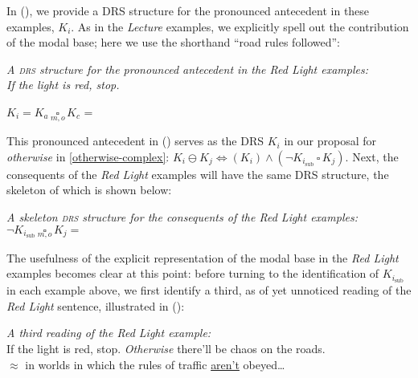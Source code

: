 In (\nextx), we provide a DRS structure for the pronounced antecedent in these examples, $K_i$. As in the \textit{Lecture} examples, we explicitly spell out the contribution of the modal base; here we use the shorthand ``road rules followed'':

\pex \label{redlight-Ki}\emph{A \textsc{drs} structure for the pronounced antecedent in the \emph{Red Light} examples:}\\
\emph{If the light is red, stop.}

\begin{center}
	$K_i=K_a\,\underset{m,o}{\square}\, K_c$ = 
\end{center}
\xe

This pronounced antecedent in (\lastx) serves as the DRS $K_i$ in our proposal for \textit{otherwise} in \ref{otherwise-complex}: $ K_i\ominus K_j\iff (K_i) \wedge (\neg K_{i_{\text{sub}}}\,\square\,K_j) $. Next, the consequents of the \textit{Red Light} examples will have the same DRS structure, the skeleton of which is shown below:

\pex \label{antec-skel}\emph{A skeleton \textsc{drs} structure for the consequents of the \emph{Red Light} examples:}\\
$\neg K_{i_{\text{sub}}}\,\underset{m,o}{\square}\,K_j = $ 
\xe


The usefulness of the explicit representation of the modal base in the \textit{Red Light} examples becomes clear at this point: before turning to the identification of $K_{i_{\text{sub}}}$ in each example above, we first identify a third, as of yet unnoticed reading of the \textit{Red Light} sentence, illustrated in (\nextx):

\pex \label{redlightR-new-reading} \textit{A third reading of the Red Light example:}\\
If the light is red, stop. \textit{Otherwise} there'll be chaos on the roads.\\{\color{violet}\phantom{If the light} $\approx$ in worlds in which the rules of traffic \ul{aren't} obeyed\ldots}\xe

